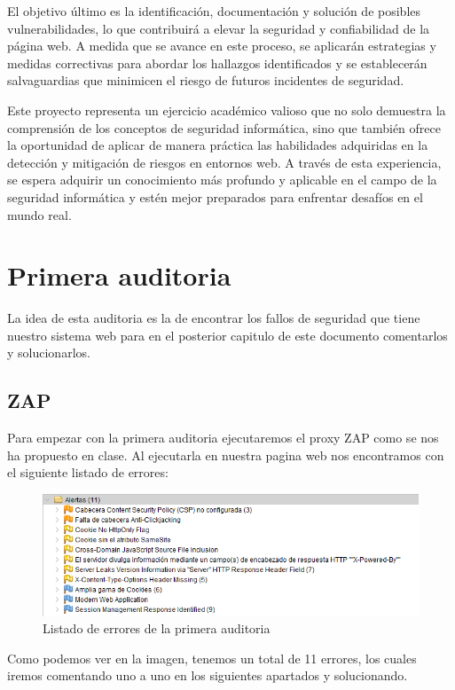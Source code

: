 \documentclass{report}
\begin{document}
        El objetivo último es la identificación, documentación y solución de posibles vulnerabilidades, lo que contribuirá a elevar la seguridad y confiabilidad de la página web. A medida que se avance en este proceso, se aplicarán estrategias y medidas correctivas para abordar los hallazgos identificados y se establecerán salvaguardias que minimicen el riesgo de futuros incidentes de seguridad.
        
        Este proyecto representa un ejercicio académico valioso que no solo demuestra la comprensión de los conceptos de seguridad informática, sino que también ofrece la oportunidad de aplicar de manera práctica las habilidades adquiridas en la detección y mitigación de riesgos en entornos web. A través de esta experiencia, se espera adquirir un conocimiento más profundo y aplicable en el campo de la seguridad informática y estén mejor preparados para enfrentar desafíos en el mundo real.
    \chapter{Primera auditoria}
        La idea de esta auditoria es la de encontrar los fallos de seguridad que tiene nuestro sistema web para en el posterior capitulo de este documento comentarlos y solucionarlos.\\
        \section{ZAP}
            Para empezar con la primera auditoria ejecutaremos el proxy ZAP como se nos ha propuesto en clase.
            Al ejecutarla en nuestra pagina web nos encontramos con el siguiente listado de errores:
            \begin{figure}[H]
                \centering
                \includegraphics[width=\textwidth]{./img/audit1/zap1.png}
                \caption{Listado de errores de la primera auditoria}
            \end{figure}
            Como podemos ver en la imagen, tenemos un total de 11 errores, los cuales iremos comentando uno a uno en los siguientes apartados y solucionando.
        \clearpage
\end{document}
